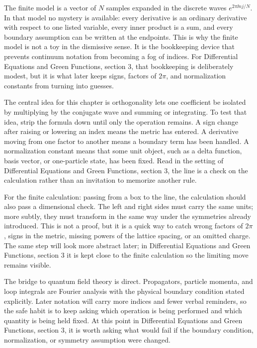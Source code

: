 The finite model is a vector of \(N\) samples expanded in the discrete waves \(e^{2\pi \ii nj/N}\).  In that model no mystery is available: every derivative is an ordinary derivative with respect to one listed variable, every inner product is a sum, and every boundary assumption can be written at the endpoints.  This is why the finite model is not a toy in the dismissive sense.  It is the bookkeeping device that prevents continuum notation from becoming a fog of indices.  For Differential Equations and Green Functions, section 3, that bookkeeping is deliberately modest, but it is what later keeps signs, factors of \(2\pi\), and normalization constants from turning into guesses.

The central idea for this chapter is orthogonality lets one coefficient be isolated by multiplying by the conjugate wave and summing or integrating.  To test that idea, strip the formula down until only the operation remains.  A sign change after raising or lowering an index means the metric has entered.  A derivative moving from one factor to another means a boundary term has been handled.  A normalization constant means that some unit object, such as a delta function, basis vector, or one-particle state, has been fixed.  Read in the setting of Differential Equations and Green Functions, section 3, the line is a check on the calculation rather than an invitation to memorize another rule.

For the finite calculation: passing from a box to the line, the calculation should also pass a dimensional check.  The left and right sides must carry the same units; more subtly, they must transform in the same way under the symmetries already introduced.  This is not a proof, but it is a quick way to catch wrong factors of \(2\pi\), signs in the metric, missing powers of the lattice spacing, or an omitted charge.  The same step will look more abstract later; in Differential Equations and Green Functions, section 3 it is kept close to the finite calculation so the limiting move remains visible.

The bridge to quantum field theory is direct.  Propagators, particle momenta, and loop integrals are Fourier analysis with the physical boundary condition stated explicitly.  Later notation will carry more indices and fewer verbal reminders, so the safe habit is to keep asking which operation is being performed and which quantity is being held fixed.  At this point in Differential Equations and Green Functions, section 3, it is worth asking what would fail if the boundary condition, normalization, or symmetry assumption were changed.

